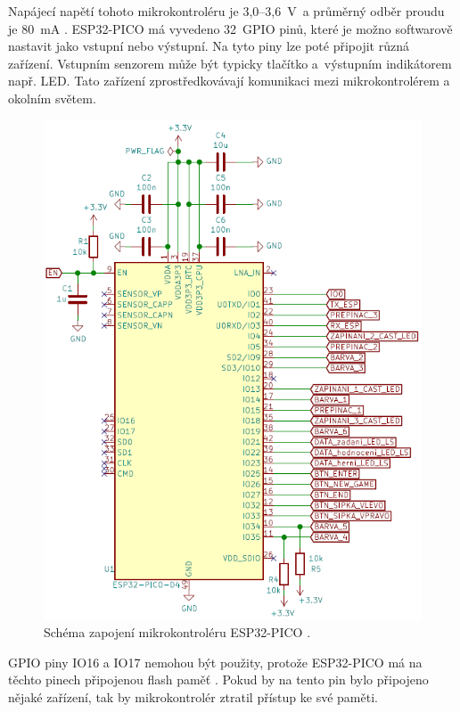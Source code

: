   Napájecí napětí tohoto mikrokontroléru je 3,0--3,6~V~a průměrný odběr proudu je 80~mA \cite{PICO_datasheet}. ESP32-PICO má vyvedeno 
  32~GPIO pinů, které je 
  možno softwarově nastavit jako vstupní nebo výstupní. Na tyto piny lze poté připojit různá zařízení. Vstupním senzorem může 
  být typicky tlačítko a~výstupním indikátorem např. LED. Tato zařízení zprostředkovávají komunikaci mezi mikrokontrolérem a okolním 
  světem.

  \begin{figure}[!h]
    \begin{center}
      \includegraphics[scale=0.5]{obrazky/ESP32_PICO_schema.png}
    \end{center}
    \caption[Schéma zapojení mikrokontroléru ESP32-PICO \cite{PICO_datasheet}]{Schéma zapojení mikrokontroléru ESP32-PICO \cite{PICO_datasheet}.}
  \end{figure}

  GPIO piny IO16 a IO17 nemohou být použity, protože ESP32-PICO má na těchto pinech připojenou flash paměť \cite{PICO_datasheet}.
  Pokud by na tento pin bylo připojeno nějaké zařízení, tak by mikrokontrolér ztratil přístup ke své paměti.

